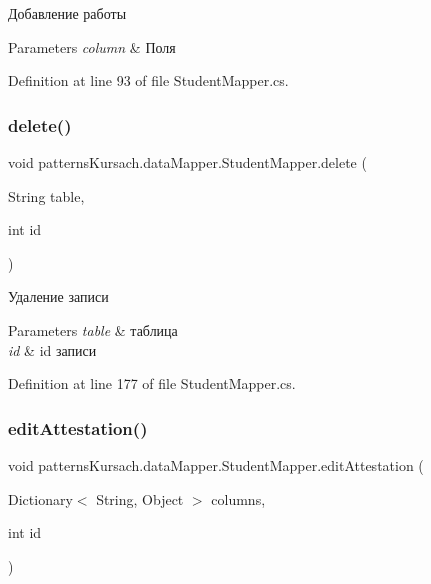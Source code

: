 Добавление работы 


\begin{DoxyParams}{Parameters}
{\em column} & Поля\\
\hline
\end{DoxyParams}


Definition at line 93 of file Student\+Mapper.\+cs.

\mbox{\label{classpatterns_kursach_1_1data_mapper_1_1_student_mapper_a6cd695afde7db19cd289b3fdd44a52da}} 
\subsubsection{\texorpdfstring{delete()}{delete()}}
{\footnotesize\ttfamily void patterns\+Kursach.\+data\+Mapper.\+Student\+Mapper.\+delete (\begin{DoxyParamCaption}\item[{String}]{table,  }\item[{int}]{id }\end{DoxyParamCaption})}



Удаление записи 


\begin{DoxyParams}{Parameters}
{\em table} & таблица\\
\hline
{\em id} & id записи\\
\hline
\end{DoxyParams}


Definition at line 177 of file Student\+Mapper.\+cs.

\mbox{\label{classpatterns_kursach_1_1data_mapper_1_1_student_mapper_aa0c568803d00abb2b828eb9a607559f0}} 
\subsubsection{\texorpdfstring{edit\+Attestation()}{editAttestation()}}
{\footnotesize\ttfamily void patterns\+Kursach.\+data\+Mapper.\+Student\+Mapper.\+edit\+Attestation (\begin{DoxyParamCaption}\item[{Dictionary$<$ String, Object $>$}]{columns,  }\item[{int}]{id }\end{DoxyParamCaption})}



